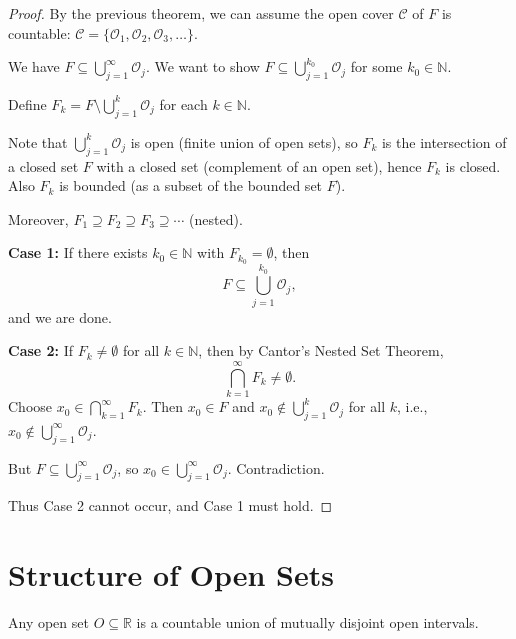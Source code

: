 \documentclass[11pt]{report}
\begin{document}
\begin{proof}
By the previous theorem, we can assume the open cover $\mathcal{C}$ of $F$ is countable: $\mathcal{C} = \{\mathcal{O}_1, \mathcal{O}_2, \mathcal{O}_3, \ldots\}$.

We have $F \subseteq \bigcup_{j=1}^\infty \mathcal{O}_j$. We want to show $F \subseteq \bigcup_{j=1}^{k_0} \mathcal{O}_j$ for some $k_0 \in \mathbb{N}$.

Define $F_k = F \setminus \bigcup_{j=1}^k \mathcal{O}_j$ for each $k \in \mathbb{N}$.

Note that $\bigcup_{j=1}^k \mathcal{O}_j$ is open (finite union of open sets), so $F_k$ is the intersection of a closed set $F$ with a closed set (complement of an open set), hence $F_k$ is closed. Also $F_k$ is bounded (as a subset of the bounded set $F$).

Moreover, $F_1 \supseteq F_2 \supseteq F_3 \supseteq \cdots$ (nested).

\textbf{Case 1:} If there exists $k_0 \in \mathbb{N}$ with $F_{k_0} = \emptyset$, then
\[
F \subseteq \bigcup_{j=1}^{k_0} \mathcal{O}_j,
\]
and we are done.

\textbf{Case 2:} If $F_k \neq \emptyset$ for all $k \in \mathbb{N}$, then by Cantor's Nested Set Theorem,
\[
\bigcap_{k=1}^\infty F_k \neq \emptyset.
\]
Choose $x_0 \in \bigcap_{k=1}^\infty F_k$. Then $x_0 \in F$ and $x_0 \notin \bigcup_{j=1}^k \mathcal{O}_j$ for all $k$, i.e., $x_0 \notin \bigcup_{j=1}^\infty \mathcal{O}_j$.

But $F \subseteq \bigcup_{j=1}^\infty \mathcal{O}_j$, so $x_0 \in \bigcup_{j=1}^\infty \mathcal{O}_j$. Contradiction.

Thus Case 2 cannot occur, and Case 1 must hold.
\end{proof}

\section{Structure of Open Sets}

\begin{propbox}
Any open set $O \subseteq \mathbb{R}$ is a countable union of mutually disjoint open intervals.
\end{propbox}
\end{document}
